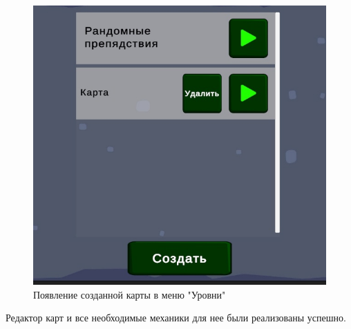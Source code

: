 \begin{figure}[h]
\centering
\includegraphics[width=0.8\linewidth]{images/bbva5UFq2a4.jpg}
\caption{Появление созданной карты в меню "Уровни"}
\label{fig:mpr}
\end{figure}

Редактор карт и все необходимые механики для нее были реализованы успешно.

